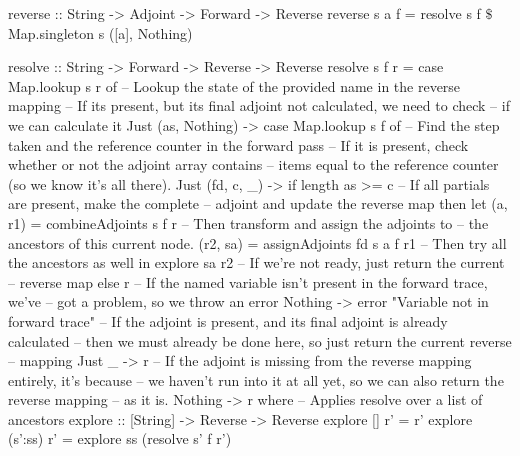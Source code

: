         \begin{haskell}[caption=Definition of the reverse pass functions, label=lst:reverse_func, gobble=12]
            reverse :: String -> Adjoint -> Forward -> Reverse
            reverse s a f = resolve s f $\$$ Map.singleton s ([a], Nothing)

            resolve :: String -> Forward -> Reverse -> Reverse
            resolve s f r = case Map.lookup s r of
                -- Lookup the state of the provided name in the reverse mapping
                -- If its present, but its final adjoint not calculated, we need to check
                -- if we can calculate it
                Just (as, Nothing) -> case Map.lookup s f of
                    -- Find the step taken and the reference counter in the forward pass
                    -- If it is present, check whether or not the adjoint array contains
                    -- items equal to the reference counter (so we know it's all there).
                    Just (fd, c, _) -> if   length as >= c
                                       -- If all partials are present, make the complete
                                       -- adjoint and update the reverse map
                                       then let (a,  r1) = combineAdjoints s f r
                                            -- Then transform and assign the adjoints to
                                            -- the ancestors of this current node.
                                                (r2, sa) = assignAdjoints fd s a f r1
                                            -- Then try all the ancestors as well
                                            in  explore sa r2
                                       -- If we're not ready, just return the current
                                       -- reverse map
                                       else r
                    -- If the named variable isn't present in the forward trace, we've
                    -- got a problem, so we throw an error
                    Nothing         -> error "Variable not in forward trace"
                -- If the adjoint is present, and its final adjoint is already calculated
                -- then we must already be done here, so just return the current reverse
                -- mapping
                Just _             -> r
                -- If the adjoint is missing from the reverse mapping entirely, it's because
                -- we haven't run into it at all yet, so we can also return the reverse mapping
                -- as it is.
                Nothing            -> r
                where
                    -- Applies resolve over a list of ancestors
                    explore :: [String] -> Reverse -> Reverse
                    explore []      r' = r'
                    explore (s':ss) r' = explore ss (resolve s' f r')
        \end{haskell}

